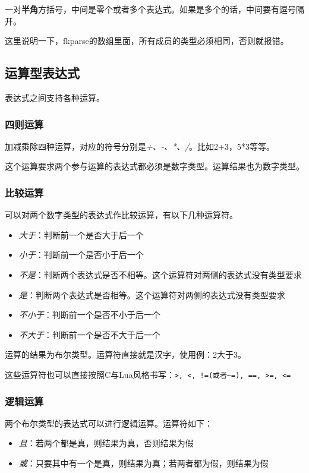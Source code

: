 一对\textbf{半角}方括号，中间是零个或者多个表达式。如果是多个的话，中间要有逗号隔开。

这里说明一下，fkparse的数组里面，所有成员的类型必须相同，否则就报错。

\subsection{运算型表达式}

表达式之间支持各种运算。

\subsubsection{四则运算}

加减乘除四种运算，对应的符号分别是\emph{+、-、*、/}。比如2+3，5*3等等。

这个运算要求两个参与运算的表达式都必须是数字类型。运算结果也为数字类型。

\subsubsection{比较运算}

可以对两个数字类型的表达式作比较运算，有以下几种运算符。

\begin{itemize}
 \item \emph{大于}：判断前一个是否大于后一个
 \item \emph{小于}：判断前一个是否小于后一个
 \item \emph{不是}：判断两个表达式是否不相等。这个运算符对两侧的表达式没有类型要求
 \item \emph{是}：判断两个表达式是否相等。这个运算符对两侧的表达式没有类型要求
 \item \emph{不小于}：判断前一个是否不小于后一个
 \item \emph{不大于}：判断前一个是否不大于后一个
\end{itemize}

运算的结果为布尔类型。运算符直接就是汉字，使用例：2大于3。

这些运算符也可以直接按照C与Lua风格书写：\verb|>, <, !=(或者~=), ==, >=, <=|

\subsubsection{逻辑运算}

两个布尔类型的表达式可以进行逻辑运算。运算符如下：

\begin{itemize}
 \item \emph{且}：若两个都是真，则结果为真，否则结果为假
 \item \emph{或}：只要其中有一个是真，则结果为真；若两者都为假，则结果为假
\end{itemize}

